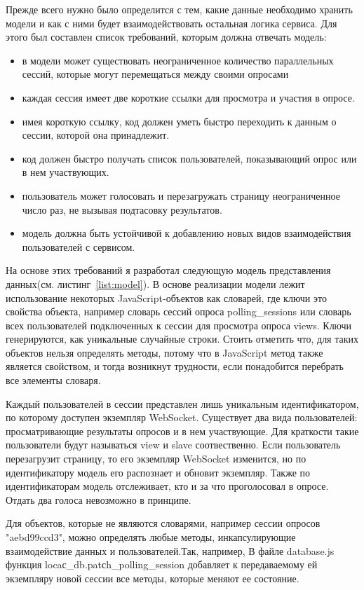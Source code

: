 Прежде всего нужно было определится с тем, какие данные необходимо хранить модели и как с ними будет взаимодействовать остальная логика сервиса. Для этого был составлен список требований, которым должна отвечать модель:
 
\begin{itemize}
 \item в модели может существовать неограниченное количество параллельных сессий, которые могут перемещаться между своими опросами 
 \item каждая сессия имеет две короткие ссылки для просмотра и участия в опросе. 
 \item имея короткую ссылку, код должен уметь быстро переходить к данным о сессии, которой она принадлежит.
 \item код должен быстро получать список пользователей, показывающий опрос или в нем участвующих.
 \item пользователь может голосовать и перезагружать страницу неограниченное число раз, не вызывая подтасовку результатов.
 \item модель должна быть устойчивой к добавлению новых видов взаимодействия пользователей с сервисом.
\end{itemize}
 
На основе этих требований я разработал следующую модель представления данных(см. листинг~\ref{list:model}). В основе реализации модели лежит использование некоторых JavaScript-объектов как словарей, где ключи это свойства объекта, например словарь сессий опроса polling\_sessions или словарь всех пользователей подключенных к сессии для просмотра опроса views. Ключи генерируются, как уникальные случайные строки. Стоить отметить что, для таких объектов нельзя определять методы, потому что в JavaScript метод также является свойством, и тогда возникнут трудности, если понадобится перебрать все элементы словаря.

Каждый пользователей в сессии представлен лишь уникальным идентификатором, по которому доступен экземпляр WebSocket. Существует два вида пользователей: просматривающие результаты опросов и в нем участвующие. Для краткости такие пользователи будут называться view и slave соотвественно. Если пользователь перезагрузит страницу, то его экземпляр WebSocket изменится, но по идентификатору модель его распознает и обновит экземпляр. Также по идентификаторам модель отслеживает, кто и за что проголосовал в опросе. Отдать два голоса невозможно в принципе. 

Для объектов, которые не являются словарями, например сессии опросов "aebd99ccd3", можно определять любые методы, инкапсулирующие взаимодействие данных и пользователей.Так, например, В файле database.js функция locaс\_db.patсh\_polling\_session добавляет к передаваемому ей экземпляру новой сессии все методы, которые меняют ее состояние.  
 
